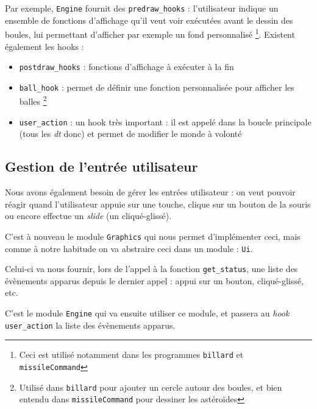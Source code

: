 \documentclass[a4paper]{scrartcl}
\begin{document}
Par exemple, \texttt{Engine} fournit des \texttt{predraw\_hooks} :
l'utilisateur indique un ensemble de fonctions d'affichage qu'il veut
voir exécutées avant le dessin des boules, lui permettant d'afficher
par exemple un fond personnalisé \footnote{Ceci est utilisé notamment
  dans les programmes \texttt{billard} et \texttt{missileCommand}}.
Existent également les hooks :
\begin{itemize}
\item \texttt{postdraw\_hooks} : fonctions d'affichage à exécuter à la fin
\item \texttt{ball\_hook} : permet de définir une fonction
  personnalisée pour afficher les balles \footnote{Utilisé dans
    \texttt{billard} pour ajouter un cercle autour des boules, et bien
    entendu dans \texttt{missileCommand} pour dessiner les astéroïdes}
\item \texttt{user\_action} : un hook très important : il est appelé
  dans la boucle principale (tous les \emph{dt} donc) et permet de
  modifier le monde à volonté
\end{itemize}

\subsection{Gestion de l'entrée utilisateur}
Nous avons également besoin de gérer les entrées utilisateur : on veut
pouvoir réagir quand l'utilisateur appuie sur une touche, clique sur
un bouton de la souris ou encore effectue un \emph{slide} (un
cliqué-glissé).

C'est à nouveau le module \texttt{Graphics} qui nous permet
d'implémenter ceci, mais comme à notre habitude on va abstraire ceci
dans un module : \texttt{Ui}.

Celui-ci va nous fournir, lors de l'appel à la fonction
\texttt{get\_status}, une liste des évènements apparus depuis le
dernier appel : appui sur un bouton, cliqué-glissé, etc.

C'est le module \texttt{Engine} qui va ensuite utiliser ce module, et
passera au \emph{hook} \texttt{user\_action} la liste des évènements
apparus.
\end{document}
